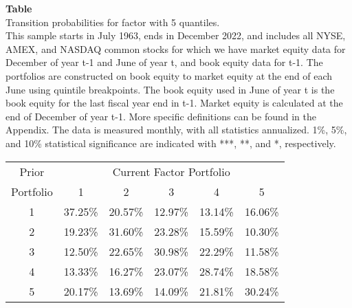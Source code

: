 \begin{table*}[ht!]
\raggedright
{}
\label{tab: transition_probs_AT_GR1industry_adjusted_with_5_quantiles}
\textbf{Table \thetable} \\
Transition probabilities for factor with 5 quantiles. \\
\hspace*{1em}This sample starts in July 1963, ends in December 2022, and includes all NYSE, AMEX, and NASDAQ common stocks for which we have market equity data for December of year t-1 and June of year t, and book equity data for t-1. The portfolios are constructed on book equity to market equity at the end of each June using quintile breakpoints.  The book equity used in June of year t is the book equity for the last fiscal year end in t-1.  Market equity is calculated at the end of December of year t-1.  More specific definitions can be found in the Appendix.  The data is measured monthly, with all statistics annualized.  1\%, 5\%, and 10\% statistical significance are indicated with ***, **, and *, respectively. \\
\vspace{0.5em}
\centering
\begin{adjustbox}{max width=\textwidth}
\begin{tabular}{@{}cccccc@{}}
\toprule
Prior & \multicolumn{5}{c}{Current Factor Portfolio} \\
Portfolio & 1 & 2 & 3 & 4 & 5 \\
\midrule
1 & 37.25\% & 20.57\% & 12.97\% & 13.14\% & 16.06\% \\
2 & 19.23\% & 31.60\% & 23.28\% & 15.59\% & 10.30\% \\
3 & 12.50\% & 22.65\% & 30.98\% & 22.29\% & 11.58\% \\
4 & 13.33\% & 16.27\% & 23.07\% & 28.74\% & 18.58\% \\
5 & 20.17\% & 13.69\% & 14.09\% & 21.81\% & 30.24\% \\
\bottomrule
\end{tabular}
\end{adjustbox}
\end{table*}